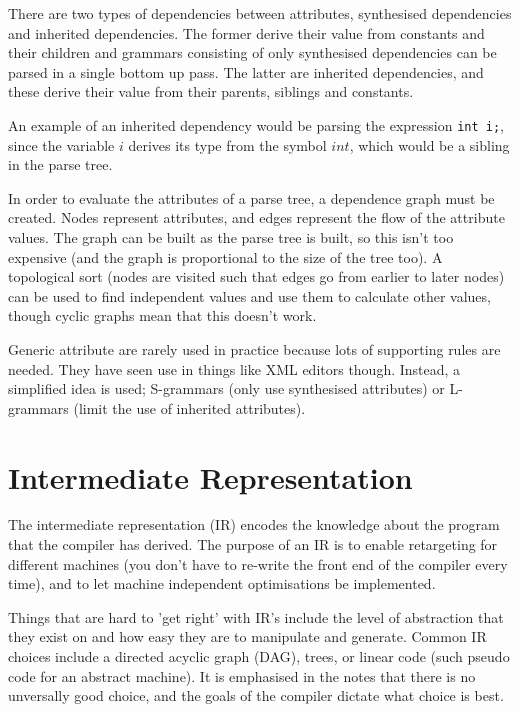 
There are two types of dependencies between attributes, synthesised
dependencies and inherited dependencies. The former derive their value
from constants and their children and grammars consisting of only
synthesised dependencies can be parsed in a single bottom up pass. The
latter are inherited dependencies, and these derive their value from
their parents, siblings and constants.

An example of an inherited dependency would be parsing the
expression \texttt{int i;}, since the variable $i$ derives its type
from the symbol $int$, which would be a sibling in the parse tree.


In order to evaluate the attributes of a parse tree, a dependence
graph must be created. Nodes represent attributes, and edges represent
the flow of the attribute values. The graph can be built as the parse
tree is built, so this isn't too expensive (and the graph is
proportional to the size of the tree too). A topological sort (nodes
are visited such that edges go from earlier to later nodes) can be
used to find independent values and use them to calculate other
values, though cyclic graphs mean that this doesn't work.

Generic attribute are rarely used in practice because lots of
supporting rules are needed. They have seen use in things like XML
editors though. Instead, a simplified idea is used; S-grammars (only
use synthesised attributes) or L-grammars (limit the use of inherited
attributes).



\section{Intermediate Representation}

The intermediate representation (IR) encodes the knowledge about the
program that the compiler has derived. The purpose of an IR is to
enable retargeting for different machines (you don't have to re-write
the front end of the compiler every time), and to let machine
independent optimisations be implemented.

Things that are hard to 'get right' with IR's include the level of
abstraction that they exist on and how easy they are to manipulate and
generate. Common IR choices include a directed acyclic graph (DAG),
trees, or linear code (such pseudo code for an abstract machine). It
is emphasised in the notes that there is no unversally good choice,
and the goals of the compiler dictate what choice is best.

